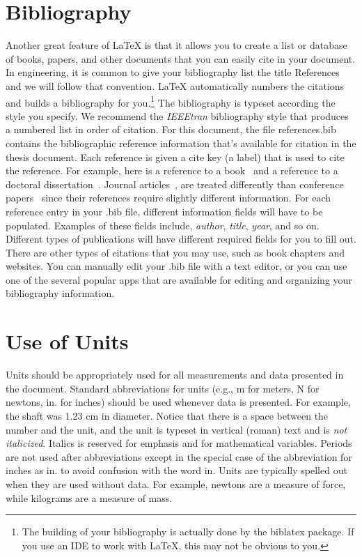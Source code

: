 \section{Bibliography}
Another great feature of \LaTeX{} is that it allows you to create a list or database of books, papers, and other documents that you can easily cite in your document. In engineering, it is common to give your bibliography list the title References and we will follow that convention. \LaTeX{} automatically numbers the citations and builds a bibliography for you.\footnote{The building of your bibliography is actually done by the {\ttfamily biblatex} package. If you use an IDE to work with \LaTeX, this may not be obvious to you.} The bibliography is typeset according the style you specify. We recommend the {\em IEEEtran} bibliography style that produces a numbered list in order of citation. For this document, the file {\ttfamily references.bib} contains the bibliographic reference information that's available for citation in the thesis document. Each reference is given a cite key (a label) that is used to cite the reference. For example, here is a reference to a book~\autocite{book1} and a reference to a doctoral dissertation~\autocite{doctoral1}. Journal articles~\autocite{journal1}, are treated differently than conference papers~\autocite{conference1} since their references require slightly different information. For each reference entry in your {\ttfamily .bib} file, different information fields will have to be populated. Examples of these fields include, {\em author}, {\em title}, {\em year}, and so on. Different types of publications will have different required fields for you to fill out. There are other types of citations that you may use, such as book chapters and websites. You can manually edit your {\ttfamily .bib} file with a text editor, or you can use one of the several popular apps that are available for editing and organizing your bibliography information.

\section{Use of Units}
Units should be appropriately used for all measurements and data presented in the document. Standard abbreviations for units (e.g., m for meters, N for newtons, in. for inches) should be used whenever data is presented. For example, the shaft was 1.23 cm in diameter. Notice that there is a space between the number and the unit, and the unit is typeset in vertical (roman) text and is {\em not italicized}. Italics is reserved for emphasis and for mathematical variables. Periods are not used after abbreviations except in the special case of the abbreviation for inches as in. to avoid confusion with the word in. Units are typically spelled out when they are used without data. For example, newtons are a measure of force, while kilograms are a measure of mass.

